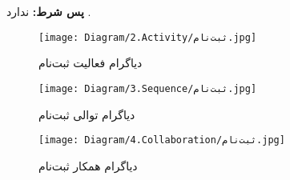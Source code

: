 \noindent
\textbf{پس شرط:}
ندارد .


\begin{figure}[H]
	\centering
	\texttt{[image: Diagram/2.Activity/ثبت‌نام.jpg]}
	\caption{دیاگرام فعالیت ثبت‌نام}
	\label{fig:a:ثبت‌نام}
\end{figure}
\begin{figure}[H]
	\centering
	\texttt{[image: Diagram/3.Sequence/ثبت‌نام.jpg]}
	\caption{دیاگرام توالی ثبت‌نام}
	\label{fig:s:ثبت‌نام}
\end{figure}
\begin{figure}[H]
\centering
\texttt{[image: Diagram/4.Collaboration/ثبت‌نام.jpg]}
\caption{دیاگرام همکار ثبت‌نام}
\label{fig:c:ثبت‌نام}
\end{figure}
